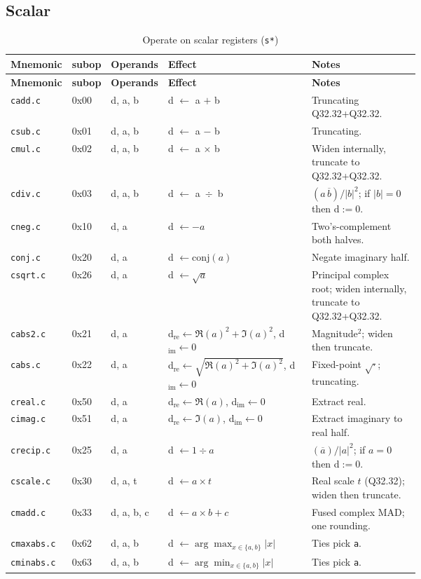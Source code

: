 \documentclass[10pt]{article}
\begin{document}
\subsection*{Scalar}
\begin{longtable}{@{}l l l L{0.38\linewidth} L{0.30\linewidth}@{}}
\caption{Operate on scalar registers (\texttt{s*})}\label{tab:rscalar}\\
\toprule
\textbf{Mnemonic} & \textbf{subop} & \textbf{Operands} & \textbf{Effect} & \textbf{Notes} \\
\midrule
\endfirsthead
\toprule
\textbf{Mnemonic} & \textbf{subop} & \textbf{Operands} & \textbf{Effect} & \textbf{Notes} \\
\midrule
\endhead
\texttt{cadd.c}   & 0x00 & d, a, b & d $\leftarrow$ a $+$ b & Truncating Q32.32+Q32.32. \\
\texttt{csub.c}   & 0x01 & d, a, b & d $\leftarrow$ a $-$ b & Truncating. \\
\texttt{cmul.c}   & 0x02 & d, a, b & d $\leftarrow$ a $\times$ b & Widen internally, truncate to Q32.32+Q32.32. \\
\texttt{cdiv.c}   & 0x03 & d, a, b & d $\leftarrow$ a \,$\div$\, b & $(a\,\overline{b})/|b|^2$; if $|b|=0$ then d$:=0$. \\
\texttt{cneg.c}   & 0x10 & d, a    & d $\leftarrow -a$ & Two’s-complement both halves. \\
\texttt{conj.c}   & 0x20 & d, a    & d $\leftarrow \mathrm{conj}(a)$ & Negate imaginary half. \\
\texttt{csqrt.c}  & 0x26 & d, a    & d $\leftarrow \sqrt{a}$ & Principal complex root; widen internally, truncate to Q32.32+Q32.32. \\
\texttt{cabs2.c}  & 0x21 & d, a    & d$_\mathrm{re}\leftarrow \Re(a)^2{+}\Im(a)^2$, d$_\mathrm{im}\leftarrow 0$ & Magnitude$^2$; widen then truncate. \\
\texttt{cabs.c}   & 0x22 & d, a    & d$_\mathrm{re}\leftarrow \sqrt{\Re(a)^2+\Im(a)^2}$, d$_\mathrm{im}\leftarrow 0$ & Fixed-point $\sqrt{\cdot}$; truncating. \\
\texttt{creal.c}  & 0x50 & d, a    & d$_\mathrm{re}\leftarrow \Re(a)$,\; d$_\mathrm{im}\leftarrow 0$ & Extract real. \\
\texttt{cimag.c}  & 0x51 & d, a    & d$_\mathrm{re}\leftarrow \Im(a)$,\; d$_\mathrm{im}\leftarrow 0$ & Extract imaginary to real half. \\
\texttt{crecip.c} & 0x25 & d, a       & d $\leftarrow 1 \div a$ & $(\overline{a})/|a|^2$; if $a{=}0$ then d$:=0$. \\
\texttt{cscale.c} & 0x30 & d, a, t    & d $\leftarrow a \times t$ & Real scale $t$ (Q32.32); widen then truncate. \\
\texttt{cmadd.c}  & 0x33 & d, a, b, c & d $\leftarrow a \times b + c$ & Fused complex MAD; one rounding. \\
\texttt{cmaxabs.c}& 0x62 & d, a, b    & d $\leftarrow \arg\max_{x\in\{a,b\}} |x|$ & Ties pick \texttt{a}. \\
\texttt{cminabs.c}& 0x63 & d, a, b    & d $\leftarrow \arg\min_{x\in\{a,b\}} |x|$ & Ties pick \texttt{a}. \\

\bottomrule
\end{longtable}
\end{document}
